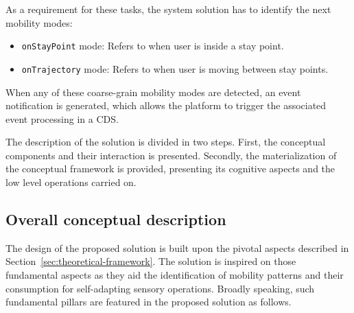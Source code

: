 \documentclass[ENG,PhD]{cinvestav}
\begin{document}
As a requirement for these tasks, the system solution has to identify the next mobility modes:
\begin{itemize}
  \item \texttt{onStayPoint} mode: Refers to when user is inside a stay point.
  \item \texttt{onTrajectory} mode: Refers to when user is moving between stay points.
\end{itemize}

When any of these coarse-grain mobility modes are detected, an event notification is generated, which allows the platform to trigger the associated event processing in a CDS.

The description of the solution is divided in two steps.
First, the conceptual components and their interaction is presented.
Secondly, the materialization of the conceptual framework is provided, presenting its cognitive aspects and the low level operations carried on.

\subsection{Overall conceptual description}
The design of the proposed solution is built upon the pivotal aspects described in Section~\ref{sec:theoretical-framework}.
The solution is inspired on those fundamental aspects as they aid the identification of mobility patterns and their consumption for self-adapting sensory operations.
Broadly speaking, such fundamental pillars are featured in the proposed solution as follows.
\end{document}
